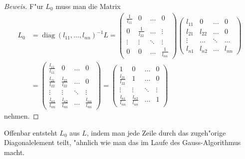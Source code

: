 \begin{proof}[Beweis]
F"ur $L_0$ muss man die Matrix
\begin{align*}
L_0&=
\operatorname{diag}(l_{11},\dots,l_{nn})^{-1} L
=
\begin{pmatrix}
\frac1{l_{11}}&0             &\dots &0\\
0             &\frac1{l_{22}}&\dots &\vdots\\
\vdots        &\vdots        &\ddots&\vdots\\
0             &0             &\dots &\frac1{l_{nn}}
\end{pmatrix}
\begin{pmatrix}
l_{11}&0     &\dots &0     \\
l_{21}&l_{22}&\dots &0     \\
\vdots&\dots &\ddots&\dots \\
l_{n1}&l_{n2}&\dots &l_{nn}
\end{pmatrix}
\\
&=
\begin{pmatrix}
\frac{l_{11}}{l_{11}}&0                    &\dots &0     \\
\frac{l_{21}}{l_{22}}&\frac{l_{22}}{l_{22}}&\dots &0     \\
\vdots               &\vdots               &\ddots&\vdots\\
\frac{l_{n1}}{l_{nn}}&\frac{l_{n2}}{l_{nn}}&\dots &\frac{l_{nn}}{l_{nn}}
\end{pmatrix}
=
\begin{pmatrix}
1                    &0                    &\dots &0     \\
\frac{l_{21}}{l_{22}}&1                    &\dots &0     \\
\vdots               &\vdots               &\ddots&\vdots\\
\frac{l_{n1}}{l_{nn}}&\frac{l_{n2}}{l_{nn}}&\dots &1
\end{pmatrix}
\end{align*}
nehmen.
\end{proof}
Offenbar entsteht $L_0$ aus $L$, indem man jede Zeile durch das zugeh"orige
Diagonalelement teilt, "ahnlich wie man das im Laufe des Gauss-Algorithmus
macht.

